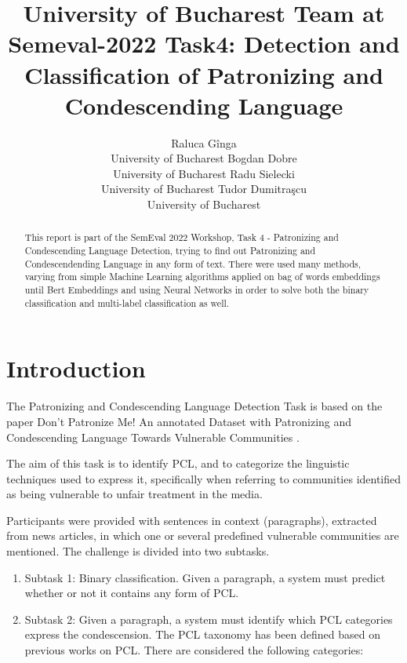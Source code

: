\documentclass[11pt]{article}
\begin{document}
\title{University of Bucharest Team at Semeval-2022 Task4: Detection and
	Classification of Patronizing and Condescending Language}
\author{Raluca G\^inga \\
	University of Bucharest
	\And Bogdan Dobre \\
	University of Bucharest
	\And Radu Sielecki \\
	University of Bucharest
	\And Tudor Dumitra\c{s}cu\\
	University of Bucharest
}
\date{}
\maketitle

\begin{abstract}
	This report is part of the SemEval 2022 Workshop, Task 4 - Patronizing and
	Condescending Language Detection, trying to find out Patronizing and
	Condescendending Language in any form of text. There were used many methods,
	varying from simple Machine Learning algorithms applied on bag of words
	embeddings until Bert Embeddings and using Neural Networks in order to solve
	both the binary classification and multi-label classification as well.
\end{abstract}

\section{Introduction}

The Patronizing and Condescending Language Detection Task is based on the
paper Don't Patronize Me! An annotated Dataset with Patronizing and
Condescending Language Towards Vulnerable Communities \cite{perezalmendros2020dont}.

The aim of this task is to identify PCL, and to categorize the linguistic
techniques used to express it, specifically when referring to communities
identified as being vulnerable to unfair treatment in the media.

Participants were provided with sentences in context (paragraphs), extracted
from news articles, in which one or several predefined vulnerable
communities are mentioned. The challenge is divided into two subtasks.

\begin{enumerate}
	\item Subtask 1: Binary classification. Given a paragraph, a system must
	      predict whether or not it contains any form of PCL.

	\item Subtask 2: Given a paragraph, a system must identify which PCL
	      categories express the condescension. The PCL taxonomy has been defined
	      based on previous works on PCL. There are considered the following
	      categories:
\end{enumerate}
\end{document}
